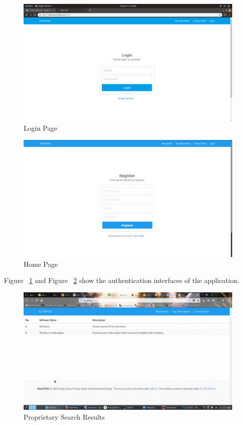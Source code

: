 \begin{figure}[h!]
\includegraphics[scale=0.29]{images/login.png}
\caption{Login Page}
\label{fig:login_page}
\end{figure}

\begin{figure}[h!]
\includegraphics[scale=0.29]{images/register.png}
\caption{Home Page}
\label{fig:register_page}
\end{figure}

Figure ~\ref{fig:login_page} and Figure ~\ref{fig:register_page} show the authentication interfaces of the application.


\begin{figure}[h!]
\includegraphics[scale=0.45]{images/4-2.png} 
\caption{Proprietary Search Results}
\label{fig:prop_srch_results}
\end{figure}

